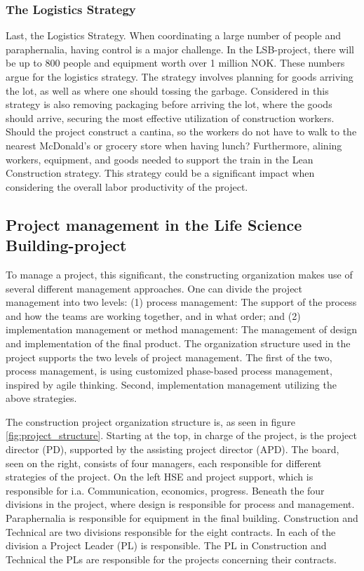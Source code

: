 \subsubsection*{The Logistics Strategy}
Last, the Logistics Strategy. When coordinating a large number of people and paraphernalia, having control is a major challenge. In the LSB-project, there will be up to 800 people and equipment worth over 1 million NOK.  These numbers argue for the logistics strategy. The strategy involves planning for goods arriving the lot, as well as where one should tossing the garbage. Considered in this strategy is also removing packaging before arriving the lot, where the goods should arrive, securing the most effective utilization of construction workers. Should the project construct a cantina, so the workers do not have to walk to the nearest McDonald's or grocery store when having lunch? Furthermore, alining workers, equipment, and goods needed to support the train in the Lean Construction strategy. This strategy could be a significant impact when considering the overall labor productivity of the project. 


\subsection{Project management in the Life Science Building-project}
To manage a project, this significant, the constructing organization makes use of several different management approaches. One can divide the project management into two levels: (1) process management: The support of the process and how the teams are working together, and in what order; and (2) implementation management or method management: The management of design and implementation of the final product. The organization structure used in the project supports the two levels of project management. The first of the two, process management, is using customized phase-based process management, inspired by agile thinking. Second, implementation management utilizing the above strategies. 

The construction project organization structure is, as seen in figure \ref{fig:project_structure}. Starting at the top, in charge of the project, is the project director (PD), supported by the assisting project director (APD). The board, seen on the right, consists of four managers, each responsible for different strategies of the project. On the left HSE and project support, which is responsible for i.a. Communication, economics, progress. Beneath the four divisions in the project, where design is responsible for process and management. Paraphernalia is responsible for equipment in the final building. Construction and Technical are two divisions responsible for the eight contracts. In each of the division a Project Leader (PL) is responsible. The PL in Construction and Technical the PLs are responsible for the projects concerning their contracts.

